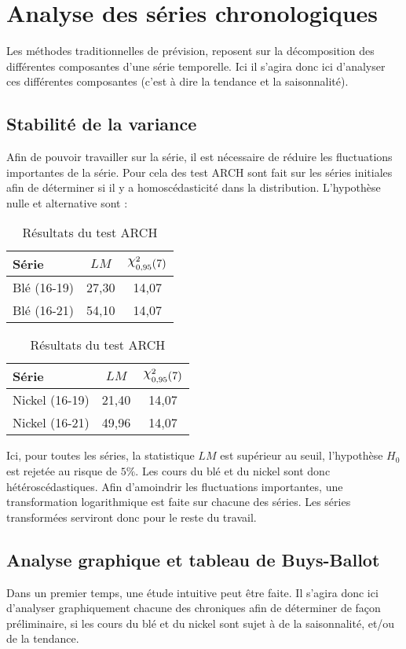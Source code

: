 \section{Analyse des séries chronologiques}
Les méthodes traditionnelles de prévision, reposent sur la décomposition des différentes composantes d'une série temporelle. Ici il s'agira donc
ici d'analyser ces différentes composantes (c'est à dire la tendance et la saisonnalité).
\subsection{Stabilité de la variance}
Afin de pouvoir travailler sur la série, il est nécessaire de réduire les 
fluctuations importantes de la série. Pour cela des test ARCH sont fait sur les 
séries initiales afin de déterminer si il y a homoscédasticité dans la distribution. L'hypothèse nulle et alternative sont :
\begin{table}[H]
    \centering
    {\sffamily
    \begin{tabular}{lcc}
        \toprule
        Série           &  $LM$ & $\rchi^{2}_{0,95} (7)$\\
        \midrule
        Blé (16-19)     & 27,30     & 14,07 \\ 
        Blé (16-21)     & 54,10     & 14,07\\
        \bottomrule
    \end{tabular}
    \begin{tabular}{lcc}
        \toprule
        Série           &  $LM$ & $\rchi^{2}_{0,95} (7)$\\
        \midrule
        Nickel (16-19)  & 21,40     & 14,07\\
        Nickel (16-21)  & 49,96     & 14,07\\
        \bottomrule
    \end{tabular}}
    \caption{Résultats du test ARCH}
\end{table}
Ici, pour toutes les séries, la statistique $LM$ est supérieur au seuil, l'hypothèse $H_{0}$ est 
rejetée au risque de $5\%$. Les cours du blé et du nickel sont donc hétéroscédastiques. Afin d'amoindrir les fluctuations importantes, une transformation 
logarithmique est faite sur chacune des séries. Les séries transformées serviront donc
pour le reste du travail.

\subsection{Analyse graphique et tableau de Buys-Ballot}\label{graph}
Dans un premier temps, une étude intuitive peut être faite. Il s'agira donc ici d'analyser graphiquement chacune des chroniques afin 
de déterminer de façon préliminaire, si les cours du blé et du nickel sont sujet à de la saisonnalité, et/ou de la tendance.


